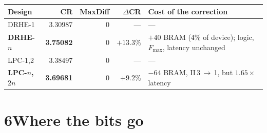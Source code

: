\documentclass[10pt,a4paper]{article}
\newcommand{\tno}[1]{\textbf{#1}}
\begin{document}
\begin{center}
\begin{minipage}{0.98\textwidth}\centering
{}
\centering\small
\begin{tabular}{@{}lrrrl@{}}
\toprule
Design & CR & MaxDiff & $\Delta$CR & Cost of the correction\\
\midrule
DRHE-1          & \num{3.30987} & 0 & --- & ---\\
\tno{DRHE-$n$}  & \tno{\num{3.75082}} & 0 & \tno{$+13.3\%$}
  & $+40$ BRAM (4\% of device); logic, $F_{\max}$, latency unchanged\\
LPC-1,2         & \num{3.38497} & 0 & --- & ---\\
\tno{LPC-$n$,$2n$} & \tno{\num{3.69681}} & 0 & \tno{$+9.2\%$}
  & $-64$ BRAM, II\,3\,$\rightarrow$\,1, but $1.65\times$ latency\\
\bottomrule
\end{tabular}
\end{minipage}
\end{center}

\section{6\quad Where the bits go}
\end{document}
